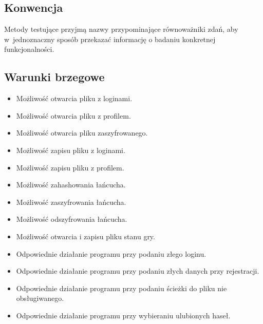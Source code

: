 \documentclass[a4paper]{article}
\begin{document}
\subsection{Konwencja}
Metody testujące przyjmą nazwy przypominające równoważniki zdań, aby w~jednoznaczny sposób przekazać informację o badaniu konkretnej funkcjonalności.


\subsection{Warunki brzegowe}
\begin{itemize}
    \item Możliwość otwarcia pliku z loginami.
    \item Możliwość otwarcia pliku z profilem.
    \item Możliwość otwarcia pliku zaszyfrowanego.
    \item Możliwość zapisu pliku z loginami.
    \item Możliwość zapisu pliku z profilem.
    \item Możliwość zahashowania łańcucha.
    \item Możliwość zaszyfrowania łańcucha.
    \item Możliwość odszyfrowania łańcucha.
    \item Możliwość otwarcia i zapisu pliku stanu gry.
    \item Odpowiednie działanie programu przy podaniu złego loginu.
    \item Odpowiednie działanie programu przy podaniu złych danych przy rejestracji.
    \item Odpowiednie działanie programu przy podaniu ścieżki do pliku nie obsługiwanego.
    \item Odpowiednie działanie programu przy wybieraniu ulubionych haseł.
\end{itemize}

\newpage
\end{document}
